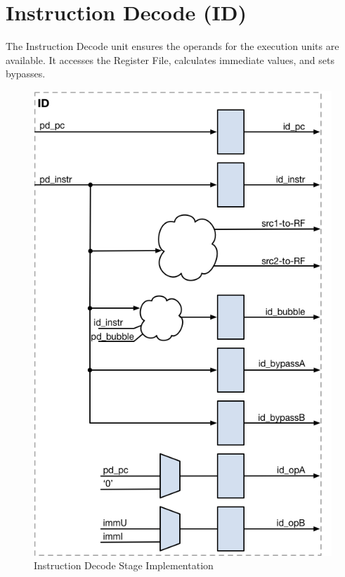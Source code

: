 \pagebreak

\section{Instruction Decode (ID)}\label{instruction-decode-id-1}

The Instruction Decode unit ensures the operands for the execution units
are available. It accesses the Register File, calculates immediate
values, and sets bypasses.

\begin{figure}[h]
  \includegraphics{assets/img/Pipeline-ID.png}
  \caption{Instruction Decode Stage Implementation}
\end{figure}

